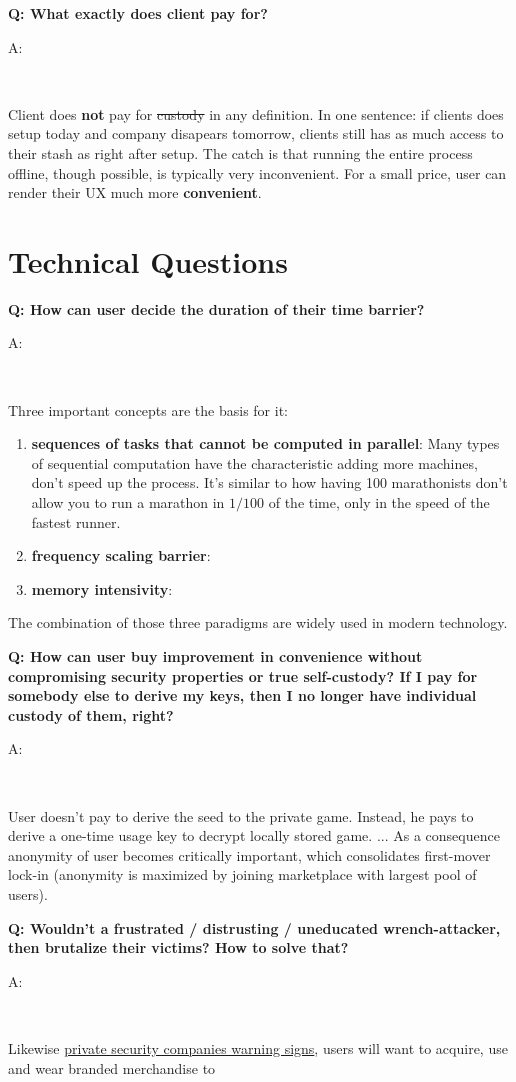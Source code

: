 \documentclass[12pt,a4paper]{article}
\newenvironment{question}[1]{%
  \vspace{0.8em}\noindent\textbf{Q: #1}\par
  \vspace{0.2em}\noindent\begin{itshape}A:\end{itshape}~%
}{\vspace{0.8em}}
\begin{document}
\begin{question}{What exactly does client pay for?}
Client does \textbf{not} pay for \sout{custody} in any definition. In one sentence: if clients does setup today and company disapears tomorrow, clients still has as much access to their stash as right after setup. The catch is that running the entire process offline, though possible, is typically very inconvenient. For a small price, user can render their UX much more \textbf{convenient}.
\end{question}

\section{Technical Questions}

\begin{question}{How can user decide the duration of their time barrier?}
Three important concepts are the basis for it:
\begin{enumerate}
 \item \textbf{sequences of tasks that cannot be computed in parallel}: Many types of sequential computation have the characteristic adding more machines, don't speed up the process. It's similar to how having 100 marathonists don't allow you to run a marathon in $1/100$ of the time, only in the speed of the fastest runner.
 \item \textbf{frequency scaling barrier}: 
 \item \textbf{memory intensivity}:
\end{enumerate}
The combination of those three paradigms are widely used in modern technology.
\end{question}

\begin{question}{How can user buy improvement in convenience without compromising security properties or true self-custody? If I pay for somebody else to derive my keys, then I no longer have individual custody of them, right?}
User doesn't pay to derive the seed to the private game. Instead, he pays to derive a one-time usage key to decrypt locally stored game.
...
As a consequence anonymity of user becomes critically important, which consolidates first-mover lock-in (anonymity is maximized by joining marketplace with largest pool of users).
\end{question}

\begin{question}{Wouldn't a frustrated / distrusting / uneducated wrench-attacker, then brutalize their victims? How to solve that?}
Likewise \href{}{private security companies warning signs}, users will want to acquire, use and wear branded merchandise to 
\end{question}
\end{document}
